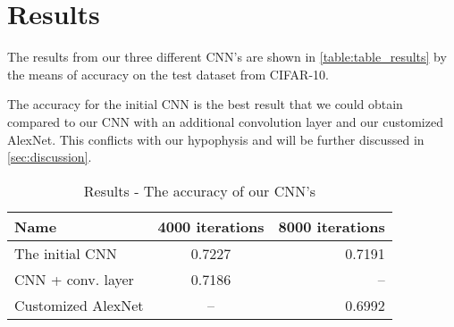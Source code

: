 \graphicspath{{Chapters/Project/}}

\section{Results} %
\label{sec:results}

The results from our three different CNN's are shown in
\autoref{table:table_results} by the means of accuracy on the test dataset from
CIFAR-10. 

The accuracy for the initial CNN is the best result that we could obtain
compared to our CNN with an additional convolution layer and our customized
AlexNet. This conflicts with our hypophysis and will be further discussed in
\autoref{sec:discussion}.

\vspace{3 mm} %
\begin{table}[H]
\centering
\sffamily
\small
\begin{tabular}{l | c r}
\toprule
Name 					& 4000 iterations		& 8000 iterations	\\
\midrule 
The initial CNN 		& 0.7227				& 0.7191			\\ 
CNN + conv. layer		& 0.7186				& --				\\ 
Customized AlexNet		& -- 					& 0.6992	 		\\ 
\bottomrule 
\end{tabular}
\caption[Short caption]{Results - The accuracy of our CNN's}
\label{table:table_results}
\end{table}





